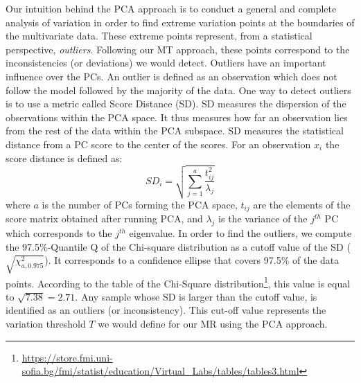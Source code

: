 Our intuition behind the PCA approach is to conduct a general and complete analysis of variation in order to find extreme variation points at the boundaries of the multivariate data. These extreme points represent, from a statistical perspective, \textit{outliers}. Following our MT approach, these points correspond to the inconsistencies (or deviations) we would detect. 
Outliers have an important influence over the PCs. An outlier is defined as an observation which does not follow the model followed by the majority of the data.
One way to detect outliers is to use a metric called Score Distance (SD). SD measures the dispersion of the observations within the PCA space. It thus measures how far an observation lies from the rest of the data within the PCA subspace. 
SD measures the statistical distance from a PC score to the center of the scores. For an observation $x_{i}$ the  score distance is defined as:
\begin{equation}
SD_{i}=\sqrt{\sum_{j=1}^{a} \frac{t_{ij}^{2}}{\lambda_{j}}}
\end{equation}
where $a$ is the number of PCs forming the PCA space, $t_{ij}$ are the elements of the score matrix obtained after running PCA, and $\lambda_{j}$ is the variance of the $j^{th}$ PC which corresponds to the $j^{th}$ eigenvalue.
In order to find the outliers, we compute the 97.5\%-Quantile Q of the Chi-square distribution as a cutoff value of the SD ($\sqrt{\chi_{a,0.975}^{2} }$). It corresponds to a confidence ellipse that covers 97.5\% of the data points. According to the table of the Chi-Square distribution\footnote{\url{https://store.fmi.uni-sofia.bg/fmi/statist/education/Virtual_Labs/tables/tables3.html}}, this value is equal to $\sqrt{7.38}=2.71$.
Any sample whose SD is larger than the cutoff value, is identified as an outliers (or inconsistency). This cut-off value represents the variation threshold $T$ we would define for our MR using the PCA approach.


